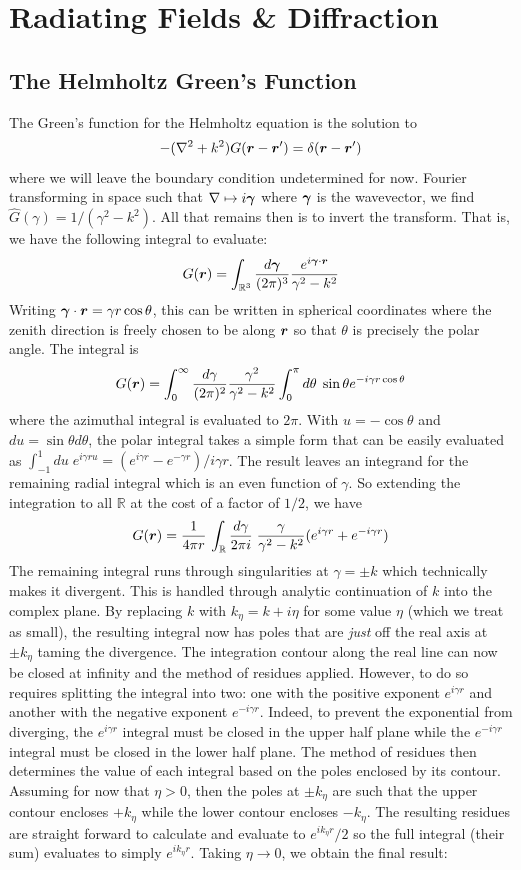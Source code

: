 \documentclass[twocolumn]{gwclass}
\newcommand{\R}{\mathbb{R}}
\begin{document}
	
	

	
	\section{Radiating Fields \& Diffraction}
	\subsection{The Helmholtz Green's Function}
	The Green's function for the Helmholtz equation is the solution to	
	$$ -(\nabla^2 + k^2)G(\boldsymbol{r}-\boldsymbol{r}')=\delta(\boldsymbol{r}-\boldsymbol{r}') $$
	where we will leave the boundary condition undetermined for now. Fourier transforming in space such that $\nabla\mapsto i\boldsymbol{\gamma}$ where $\boldsymbol{\gamma}$ is the wavevector, we find $ \widehat{G}(\gamma) = 1/(\gamma^2-k^2)  $. All that remains then is to invert the transform. That is, we have the following integral to evaluate:
	$$ G(\*r) = \int_{\R^3}\frac{d\*\gamma}{(2\pi)^3}\frac{e^{i\*\gamma\cdot\*r}}{\gamma^2 - k^2} $$
	Writing $\boldsymbol{\gamma}\cdot\boldsymbol{r}=\gamma r\cos\theta$, this can be written in spherical coordinates where the zenith direction is freely chosen to be along $\boldsymbol{r}$ so that $\theta$ is precisely the polar angle. The integral is
	$$ G(\boldsymbol{r}) =  \int_0^\infty \frac{d\gamma}{(2\pi)^2}\frac{\gamma^2}{\gamma^2 - k^2}\int_0^\pi d\theta\;\sin\theta e^{-i\gamma r\cos \theta} $$
	where the azimuthal integral is evaluated to $2\pi$. With $u=-\cos\theta$ and $du=\sin\theta d\theta$, the polar integral takes a simple form that can be easily evaluated as $\int_{-1}^1 du\;e^{i\gamma r u}= (e^{i\gamma r} - e^{-\gamma r})/i\gamma r$. The result leaves an integrand for the remaining radial integral which is an even function of $\gamma$. So extending the integration to all $\R$ at the cost of a factor of $1/2$, we have
	$$ G(\*r) = \frac{1}{4\pi r}\,   \int_\R \frac{d\gamma}{2\pi i}\;\frac{\gamma  }{\gamma^2 - k^2}(e^{i\gamma r} + e^{-i\gamma r})$$
	The remaining integral runs through singularities at $\gamma=\pm k$ which technically makes it divergent. This is handled through analytic continuation of $k$ into the complex plane. By replacing $k$ with $k_\eta=k+i\eta$ for some value $\eta$ (which we treat as small), the resulting integral now has poles that are \emph{just} off the real axis at $\pm k_\eta$ taming the divergence. The integration contour along the real line can now be closed at infinity and the method of residues applied. However, to do so requires splitting the integral into two: one with the positive exponent $e^{i\gamma r}$ and another with the negative exponent $e^{-i\gamma r}$. Indeed, to prevent the exponential from diverging, the $e^{i\gamma r}$ integral must be closed in the upper half plane while the $e^{-i\gamma r}$ integral must be closed in the lower half plane. The method of residues then determines the value of each integral based on the poles enclosed by its contour. Assuming for now that $\eta>0$, then the poles at $\pm k_\eta$ are such that the upper contour encloses $+k_\eta$ while the lower contour encloses $-k_\eta$. The resulting residues are straight forward to calculate and evaluate to $e^{ik_\eta r}/2$ so the full integral (their sum) evaluates to simply $e^{ik_\eta r}$. Taking $\eta \to 0$, we obtain the final result:
\end{document}
